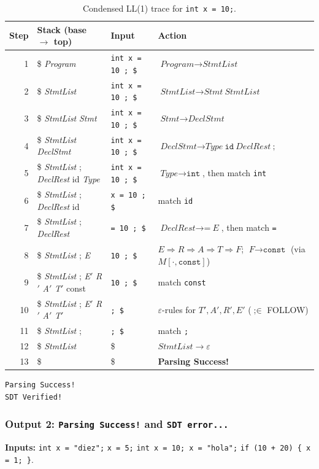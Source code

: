 \documentclass[11pt,a4paper]{article}
\newcommand{\eps}{\varepsilon}
\newcommand{\nt}[1]{\textit{#1}}
\newcommand{\tk}[1]{\texttt{#1}}
\begin{document}
\begin{table}[H]
\centering
\scriptsize
\begin{tabularx}{\textwidth}{@{}rX>{\raggedright\arraybackslash}p{3.6cm}X@{}}
\toprule
\textbf{Step} & \textbf{Stack (base $\to$ top)} & \textbf{Input} & \textbf{Action}\\
\midrule
1 & \$ \nt{Program} & \tk{int x = 10 ; \$} & $\nt{Program}\to\nt{StmtList}$\\
2 & \$ \nt{StmtList} & \tk{int x = 10 ; \$} & $\nt{StmtList}\to\nt{Stmt}\ \nt{StmtList}$\\
3 & \$ \nt{StmtList} \nt{Stmt} & \tk{int x = 10 ; \$} & $\nt{Stmt}\to\nt{DeclStmt}$\\
4 & \$ \nt{StmtList} \nt{DeclStmt} & \tk{int x = 10 ; \$} & $\nt{DeclStmt}\to\nt{Type}\ \tk{id}\ \nt{DeclRest}\ \tk{;}$\\
5 & \$ \nt{StmtList} ; \nt{DeclRest} id \nt{Type} & \tk{int x = 10 ; \$} & $\nt{Type}\to\tk{int}$, then match \tk{int}\\
6 & \$ \nt{StmtList} ; \nt{DeclRest} id & \tk{x = 10 ; \$} & match \tk{id}\\
7 & \$ \nt{StmtList} ; \nt{DeclRest} & \tk{= 10 ; \$} & $\nt{DeclRest}\to\tk{=}\ \nt{E}$, then match \tk{=}\\
8 & \$ \nt{StmtList} ; \nt{E} & \tk{10 ; \$} & $\nt{E}\Rightarrow\nt{R}\Rightarrow\nt{A}\Rightarrow\nt{T}\Rightarrow\nt{F}$; $\nt{F}\to\tk{const}$ (via $M[\cdot,\tk{const}]$)\\
9 & \$ \nt{StmtList} ; \nt{E}$'$ \nt{R}$'$ \nt{A}$'$ \nt{T}$'$ const & \tk{10 ; \$} & match \tk{const}\\
10 & \$ \nt{StmtList} ; \nt{E}$'$ \nt{R}$'$ \nt{A}$'$ \nt{T}$'$ & \tk{; \$} & $\eps$-rules for $\nt{T}',\nt{A}',\nt{R}',\nt{E}'$ ($\tk{;}\in$ FOLLOW)\\
11 & \$ \nt{StmtList} ; & \tk{; \$} & match \tk{;}\\
12 & \$ \nt{StmtList} & \$ & $\nt{StmtList}\to\eps$\\
13 & \$ & \$ & \textbf{Parsing Success!}\\
\bottomrule
\end{tabularx}
\caption{Condensed LL(1) trace for \texttt{int x = 10;}.}
\label{tab:trace}
\end{table}

\begin{lstlisting}
Parsing Success!
SDT Verified!
\end{lstlisting}

\subsubsection{Output 2: \texttt{Parsing Success!} and \texttt{SDT error...}}
\textbf{Inputs:} \texttt{int x = "diez";} \quad \texttt{x = 5;} \quad \texttt{int x = 10; x = "hola";} \quad \texttt{if (10 + 20) \{ x = 1; \}}.
\end{document}
